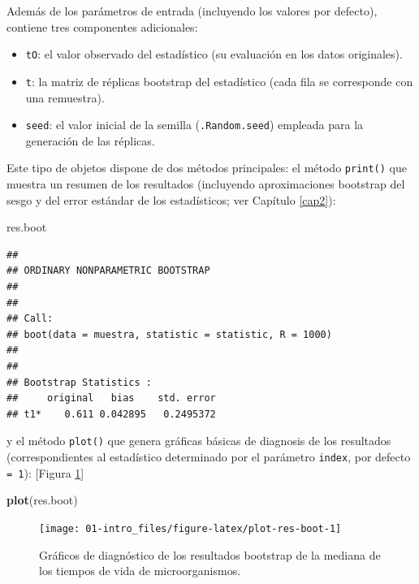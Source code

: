 \documentclass[]{book}
\newenvironment{Shaded}{\begin{snugshade}}{\end{snugshade}}
\newcommand{\KeywordTok}[1]{\textcolor[rgb]{0.13,0.29,0.53}{\textbf{#1}}}
\newcommand{\NormalTok}[1]{#1}
\theoremstyle{definition}
\theoremstyle{definition}
\theoremstyle{definition}
\theoremstyle{remark}
\begin{document}
Además de los parámetros de entrada (incluyendo los valores por
defecto), contiene tres componentes adicionales:

\begin{itemize}
\item
  \texttt{tO}: el valor observado del estadístico (su evaluación en los
  datos originales).
\item
  \texttt{t}: la matriz de réplicas bootstrap del estadístico (cada fila
  se corresponde con una remuestra).
\item
  \texttt{seed}: el valor inicial de la semilla (\texttt{.Random.seed})
  empleada para la generación de las réplicas.
\end{itemize}

Este tipo de objetos dispone de dos métodos principales: el método
\texttt{print()} que muestra un resumen de los resultados (incluyendo
aproximaciones bootstrap del sesgo y del error estándar de los
estadísticos; ver Capítulo \ref{cap2}):

\begin{Shaded}
\begin{Highlighting}[]
\NormalTok{res.boot}
\end{Highlighting}
\end{Shaded}

\begin{verbatim}
## 
## ORDINARY NONPARAMETRIC BOOTSTRAP
## 
## 
## Call:
## boot(data = muestra, statistic = statistic, R = 1000)
## 
## 
## Bootstrap Statistics :
##     original   bias    std. error
## t1*    0.611 0.042895   0.2495372
\end{verbatim}

y el método \texttt{plot()} que genera gráficas básicas de diagnosis de
los resultados (correspondientes al estadístico determinado por el
parámetro \texttt{index}, por defecto \texttt{=\ 1}): {[}Figura
\ref{fig:plot-res-boot}{]}

\begin{Shaded}
\begin{Highlighting}[]
\KeywordTok{plot}\NormalTok{(res.boot)}
\end{Highlighting}
\end{Shaded}

\begin{figure}[!htb]

{\centering \texttt{[image: 01-intro\_files/figure-latex/plot-res-boot-1]} 

}

\caption{Gráficos de diagnóstico de los resultados bootstrap de la mediana de los tiempos de vida de microorganismos.}\label{fig:plot-res-boot}
\end{figure}
\end{document}
